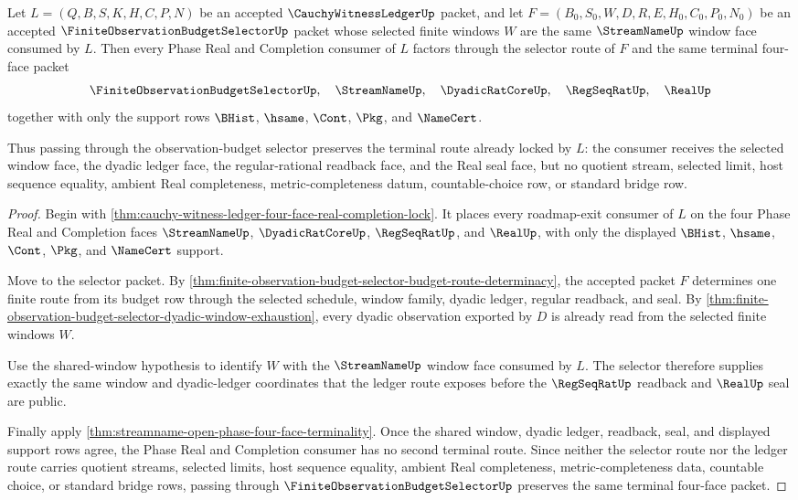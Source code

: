 \begin{theorem}
\label{thm:cauchy-witness-ledger-budget-selector-four-face-exhaustion}
Let $L=(Q,B,S,K,H,C,P,N)$ be an accepted $\CauchyWitnessLedgerUp$ packet, and let $F=(B_0,S_0,W,D,R,E,H_0,C_0,P_0,N_0)$ be an accepted $\FiniteObservationBudgetSelectorUp$ packet whose selected finite windows $W$ are the same $\StreamNameUp$ window face consumed by $L$. Then every Phase Real and Completion consumer of $L$ factors through the selector route of $F$ and the same terminal four-face packet
$$
\FiniteObservationBudgetSelectorUp,\quad \StreamNameUp,\quad \DyadicRatCoreUp,\quad \RegSeqRatUp,\quad \RealUp
$$
together with only the support rows $\BHist$, $\hsame$, $\Cont$, $\Pkg$, and $\NameCert$.

Thus passing through the observation-budget selector preserves the terminal route already locked by $L$: the consumer receives the selected window face, the dyadic ledger face, the regular-rational readback face, and the Real seal face, but no quotient stream, selected limit, host sequence equality, ambient Real completeness, metric-completeness datum, countable-choice row, or standard bridge row.
\end{theorem}
\begin{proof}
Begin with \autoref{thm:cauchy-witness-ledger-four-face-real-completion-lock}. It places every roadmap-exit consumer of $L$ on the four Phase Real and Completion faces $\StreamNameUp$, $\DyadicRatCoreUp$, $\RegSeqRatUp$, and $\RealUp$, with only the displayed $\BHist$, $\hsame$, $\Cont$, $\Pkg$, and $\NameCert$ support.

Move to the selector packet. By \autoref{thm:finite-observation-budget-selector-budget-route-determinacy}, the accepted packet $F$ determines one finite route from its budget row through the selected schedule, window family, dyadic ledger, regular readback, and seal. By \autoref{thm:finite-observation-budget-selector-dyadic-window-exhaustion}, every dyadic observation exported by $D$ is already read from the selected finite windows $W$.

Use the shared-window hypothesis to identify $W$ with the $\StreamNameUp$ window face consumed by $L$. The selector therefore supplies exactly the same window and dyadic-ledger coordinates that the ledger route exposes before the $\RegSeqRatUp$ readback and $\RealUp$ seal are public.

Finally apply \autoref{thm:streamname-open-phase-four-face-terminality}. Once the shared window, dyadic ledger, readback, seal, and displayed support rows agree, the Phase Real and Completion consumer has no second terminal route. Since neither the selector route nor the ledger route carries quotient streams, selected limits, host sequence equality, ambient Real completeness, metric-completeness data, countable choice, or standard bridge rows, passing through $\FiniteObservationBudgetSelectorUp$ preserves the same terminal four-face packet.
\end{proof}

